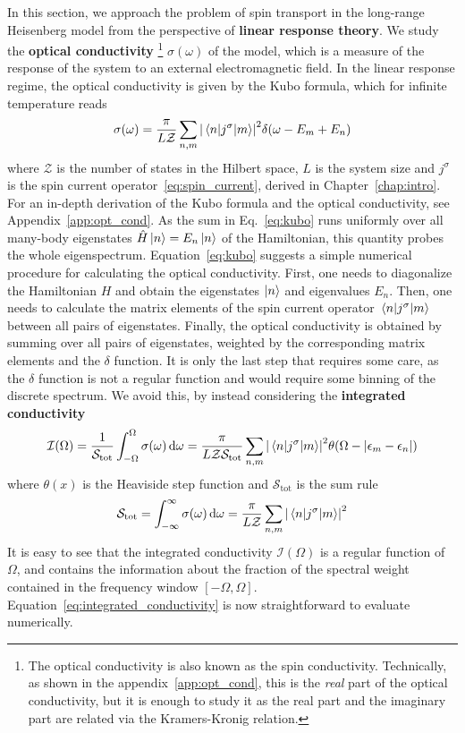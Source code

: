 In this section, we approach the problem of spin transport in the long-range Heisenberg model from the
perspective of \textbf{linear response theory}. We study the \textbf{optical conductivity}
\footnote{The optical conductivity is also known as the spin conductivity. Technically, as shown in the appendix~\ref{app:opt_cond},
this is the \textit{real} part of the optical conductivity, but it is enough to study it as the real part and the imaginary part
are related via the Kramers-Kronig relation.} \(\sigma(\omega)\) of the model,
which is a measure of the response of the system to an external electromagnetic field.
In the linear response regime, the optical conductivity is given by the Kubo formula, which
for infinite temperature reads
\begin{equation}
  \sigma(\omega) = \frac{\pi}{L \mathcal{Z}} \sum_{n,m} \abs{\mel{n}{j^{\sigma}}{m}}^2 \delta(\omega - E_m + E_n)
  \label{eq:kubo}
\end{equation}
where \(\mathcal{Z}\) is the number of states in the Hilbert space, \(L\) is the system size and \(j^{\sigma}\) is the spin
current operator~\eqref{eq:spin_current}, derived in Chapter~\ref{chap:intro}.
For an in-depth derivation of the Kubo formula and the optical conductivity, see Appendix~\ref{app:opt_cond}.
As the sum in Eq.~\eqref{eq:kubo} runs
uniformly over all many-body eigenstates \(\hat{H}  \ket{n} = E_n \ket{n}\) of the Hamiltonian, this quantity
probes the whole eigenspectrum. Equation~\eqref{eq:kubo} suggests a simple numerical procedure for calculating
the optical conductivity. First, one needs to diagonalize the Hamiltonian \(H\) and obtain the eigenstates
\(\ket{n}\) and eigenvalues \(E_n\). Then, one needs to calculate the matrix elements of the spin current operator
\(\mel{n}{j^{\sigma}}{m}\) between all pairs of eigenstates. Finally, the optical conductivity is obtained by
summing over all pairs of eigenstates, weighted by the corresponding matrix elements and the \(\delta\) function.
It is only the last step that requires some care, as the \(\delta\) function is not a regular function and
would require some binning of the discrete spectrum. We avoid this, by instead considering the
\textbf{integrated conductivity}
\begin{equation}
  \mathcal{I}(\Omega) = \frac{1}{\mathcal{S}_{\mathrm{tot}}} \int_{-\Omega}^{\Omega} \sigma(\omega) \dd{\omega} =
  \frac{\pi}{L \mathcal{Z} \mathcal{S}_{\mathrm{tot}}} \sum_{n,m} \abs{\mel{n}{j^{\sigma}}{m}}^2 \theta(\Omega- \abs{\epsilon_m - \epsilon_n})
  \label{eq:integrated_conductivity}
\end{equation}
where \(\theta(x)\) is the Heaviside step function and  \(\mathcal{S}_{\mathrm{tot}}\) is the sum rule
\begin{equation}
  \mathcal{S}_{\mathrm{tot}} = \int_{-\infty}^{\infty} \sigma(\omega) \dd{\omega} = \frac{\pi}{L \mathcal{Z}} \sum_{n,m} \abs{\mel{n}{j^{\sigma}}{m}}^2
\end{equation}
It is easy to see that the integrated conductivity \(\mathcal{I}(\Omega)\) is a regular function of \(\Omega\), and
contains the information about the fraction of the spectral weight contained in the frequency window
\(\left[-\Omega,\Omega\right]\).
Equation~\eqref{eq:integrated_conductivity} is now straightforward to evaluate numerically.


